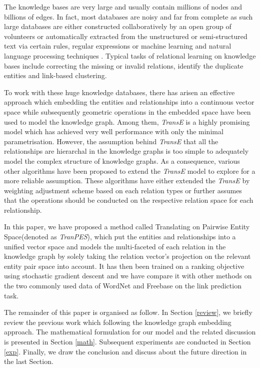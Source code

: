 \documentclass[9pt]{sig-alternate-05-2015}
\begin{document}
The knowledge bases are very large and usually contain millions of nodes and billions of edges. In fact, most databases are noisy and far from complete as such large databases are either constructed collaboratively by an open group of volunteers or  automatically extracted from the unstructured or semi-structured  text via certain rules, regular expressions or machine learning and natural language processing techniques \cite{weikum_information_2010}. Typical tasks of relational learning on knowledge bases include correcting the missing or invalid relations, identify the duplicate entities and link-based clustering. 

To work with these huge knowledge databases, there has arisen an effective approach which embedding the entities and relationships into a continuous vector space while subsequently geometric operations in the embedded space have been used to model the knowledge graph. Among them, \emph{TransE} \cite{bordes_translating_2013} is a highly promising model which has achieved very well performance with only the minimal parametrisation. However, the assumption behind \emph{TransE} that  all the relationships are hierarchal in the knowledge graphs is too simple to adequately model the complex structure of  knowledge graphs. As a consequence, various other algorithms \cite{fan_transition-based_2014} \cite{wang_knowledge_2014} \cite{lin_learning_2015} \cite{garcia-duran_composing_2015}  have been proposed to extend the \emph{TransE} model to explore for a more reliable assumption. These algorithms have either extended the \emph{TransE} by weighting adjustment scheme based on each relation types  or further assumes that the operations should be conducted on the respective relation space for each relationship. 

In this paper, we have proposed a method called Translating on Pairwise Entity Space(denoted as \emph{TranPES}),  which  put the entities and relationships into a unified vector space and models the multi-faceted of each relation in the knowledge graph by solely  taking the relation vector's projection on the relevant entity pair space into account. It has then been trained on a ranking objective using stochastic gradient descent and we have compare it with other methods on the two commonly used data  of WordNet \cite{miller_wordnet:_1995} and Freebase \cite{bollacker_freebase:_2008} on the link prediction task.

The remainder of this paper is organised as follow. In Section \ref{review}, we briefly review the previous work which following the knowledge graph embedding approach. The mathematical formulation for our model and the related discussion is presented in Section \ref{math}. Subsequent experiments are conducted in Section \ref{exp}. Finally, we draw the conclusion and discuss about the future direction in the last Section.
\end{document}
